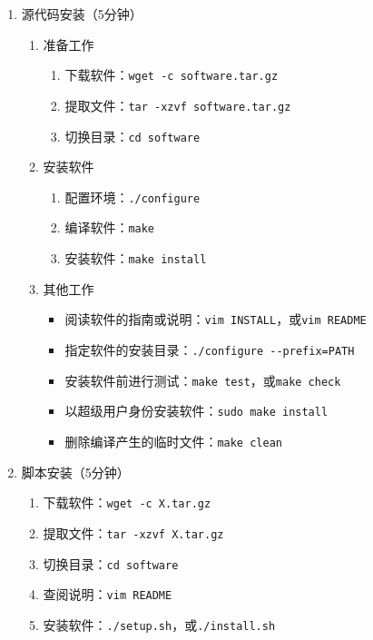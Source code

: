 \documentclass{TIJMUjiaoanSY}
\begin{document}
\begin{enumerate}
  \item 源代码安装（5分钟）
    \begin{enumerate}
      \item 准备工作
	\begin{enumerate}
          \item 下载软件：\verb|wget -c software.tar.gz|
	  \item 提取文件：\verb|tar -xzvf software.tar.gz|
	  \item 切换目录：\verb|cd software|
	\end{enumerate}
      \item 安装软件
	\begin{enumerate}
          \item 配置环境：\verb|./configure|
	  \item 编译软件：\verb|make|
	  \item 安装软件：\verb|make install|
	\end{enumerate}
      \item 其他工作
	\begin{itemize}
	  \item 阅读软件的指南或说明：\verb|vim INSTALL|，或\verb|vim README|
	  \item 指定软件的安装目录：\verb|./configure --prefix=PATH|
	  \item 安装软件前进行测试：\verb|make test|，或\verb|make check|
	  \item 以超级用户身份安装软件：\verb|sudo make install|
	  \item 删除编译产生的临时文件：\verb|make clean|
	\end{itemize}
    \end{enumerate}

  \item 脚本安装（5分钟）
    \vspace*{-10pt}
    \begin{multicols}{2}
    \begin{enumerate}
      \item 下载软件：\verb|wget -c X.tar.gz|
      \item 提取文件：\verb|tar -xzvf X.tar.gz|
      \item 切换目录：\verb|cd software|
      \item 查阅说明：\verb|vim README|
      \item 安装软件：\verb|./setup.sh|，或\verb|./install.sh|
    \end{enumerate}
    \end{multicols}
    \vspace*{-10pt}


\end{enumerate}
\end{document}
